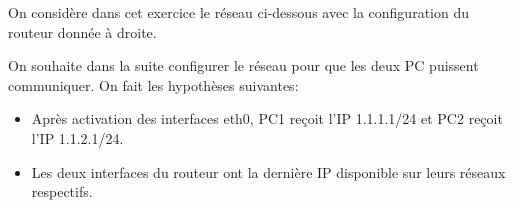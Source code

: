 
On considère dans cet exercice le réseau ci-dessous avec la
configuration du routeur donnée à droite.\\

\begin{minipage}{0.51\textwidth}
  \begin{center}
    
  \end{center}
\end{minipage}
\begin{minipage}{0.4\textwidth}
  
\end{minipage}

On souhaite dans la suite configurer le réseau pour que les deux PC
puissent communiquer. On fait les hypothèses suivantes:
\begin{itemize}
\item Après activation des interfaces eth0, PC1 reçoit l'IP 1.1.1.1/24 et
  PC2 reçoit l'IP 1.1.2.1/24.
\item Les deux interfaces du routeur ont la dernière IP disponible sur
  leurs réseaux respectifs.
\end{itemize}
